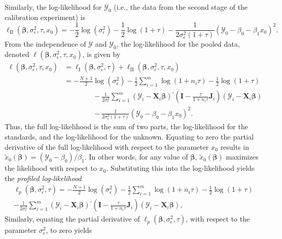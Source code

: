 \documentclass{article}\usepackage[]{graphicx}\usepackage[]{color}
\newcommand{\trans}{\ensuremath{^\prime}}
\newcommand{\X}{\ensuremath{\bm{X}}}
\newcommand{\newln}{\\&\quad\quad\quad\quad{}}
\begin{document}
Similarly, the log-likelihood for $\mathcal{Y}_0$ (i.e., the data from the second stage of the calibration experiment) is 
\[
  \mathcal{\ell}_{\mathrm{II}}\left(\bm{\beta}, \sigma_\epsilon^2, \tau, x_0\right) = -\frac{1}{2}\log\left(\sigma_\epsilon^2\right) - \frac{1}{2}\log\left(1 + \tau\right) - \frac{1}{2\sigma_\epsilon^2\left(1 + \tau\right)}\left(\mathcal{Y}_0 - \beta_0 - \beta_1 x_0\right)^2.
\]
From the independence of $\bm{\mathcal{Y}}$ and $\mathcal{Y}_0$, the log-likelihood for the pooled data, denoted $\mathcal{\ell}\left(\bm{\beta}, \sigma_\epsilon^2, \tau, x_0\right)$, is given by
\begin{align*}
  \ell\left(\bm{\beta}, \sigma_\epsilon^2, \tau, x_0\right) &= \mathcal{\ell}_{\mathrm{I}}\left(\bm{\beta}, \sigma_\epsilon^2, \tau\right) + \mathcal{\ell}_{\mathrm{II}}\left(\bm{\beta}, \sigma_\epsilon^2, \tau, x_0\right) \\
  &= -\frac{N+1}{2}\log\left(\sigma_\epsilon^2\right) - \frac{1}{2}\sum_{i = 1}^m \log\left(1 + n_i\tau\right) - \frac{1}{2}\log\left(1 + \tau\right) \newln - \frac{1}{2\sigma_\epsilon^2}\sum_{i = 1}^m \left(\bm{\mathcal{Y}}_i - \X_i\bm{\beta}\right)\trans\left(\bm{I} - \frac{\tau}{1 + n_i\tau}\bm{J}_i\right)\left(\bm{\mathcal{Y}}_i - \X_i\bm{\beta}\right) \newln - \frac{1}{2\sigma_\epsilon^2\left(1 + \tau\right)}\left(\mathcal{Y}_0 - \beta_0 - \beta_1 x_0\right)^2.
\end{align*}
Thus, the full log-likelihood is the sum of two parts, the log-likelihood for the standards, and the log-likelihood for the unknown. Equating to zero the partial derivative of the full log-likelihood with respect to the parameter $x_0$ results in $\widetilde{x}_0\left(\bm{\beta}\right) = \left(\mathcal{Y}_0 - \beta_0\right)/\beta_1$. In other words, for any value of $\bm{\beta}$, $\widetilde{x}_0\left(\bm{\beta}\right)$ maximizes the likelihood with respect to $x_0$. Substituting this into the log-likelihood yields the \textit{profiled log-likelihood}
\begin{multline*}
  \mathcal{\ell}_p\left(\bm{\beta}, \sigma_\epsilon^2, \tau\right) = -\frac{N+1}{2}\log\left(\sigma_\epsilon^2\right) - \frac{1}{2}\sum_{i = 1}^m \log\left(1 + n_i\tau\right) - \frac{1}{2}\log\left(1 + \tau\right) \\ - \frac{1}{2\sigma_\epsilon^2}\sum_{i = 1}^m \left(\bm{\mathcal{Y}}_i - \X_i\bm{\beta}\right)\trans\left(\bm{I} - \frac{\tau}{1 + n_i\tau}\bm{J}_i\right)\left(\bm{\mathcal{Y}}_i - \X_i\bm{\beta}\right),
\end{multline*}
Similarly, equating the partial derivative of $\mathcal{\ell}_p\left(\bm{\beta}, \sigma_\epsilon^2, \tau\right)$, with respect to the parameter $\sigma_\epsilon^2$, to zero yields 
\end{document}
